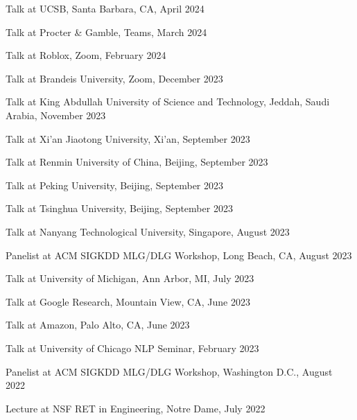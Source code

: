 \documentclass[10pt]{article}
\newenvironment{myindentpar}[1]%
{\begin{list}{}%
         {\setlength{\leftmargin}{#1}}%
         \item[]%
}
{\end{list}}
\newcounter{list}
\begin{document}
\begin{myindentpar}{0.75cm}
\hspace{-0.75cm} Talk at UCSB, Santa Barbara, CA, April 2024

\hspace{-0.75cm} Talk at Procter \& Gamble, Teams, March 2024
	
\hspace{-0.75cm} Talk at Roblox, Zoom, February 2024
	
\hspace{-0.75cm} Talk at Brandeis University, Zoom, December 2023	

\hspace{-0.75cm} Talk at King Abdullah University of Science and Technology, Jeddah, Saudi Arabia, November 2023	

\hspace{-0.75cm} Talk at Xi'an Jiaotong University, Xi'an, September 2023

\hspace{-0.75cm} Talk at Renmin University of China, Beijing, September 2023	
	
\hspace{-0.75cm} Talk at Peking University, Beijing, September 2023	

\hspace{-0.75cm} Talk at Tsinghua University, Beijing, September 2023
	
\hspace{-0.75cm} Talk at Nanyang Technological University, Singapore, August 2023	
	
\hspace{-0.75cm} Panelist at ACM SIGKDD MLG/DLG Workshop, Long Beach, CA, August 2023

\hspace{-0.75cm} Talk at University of Michigan, Ann Arbor, MI, July 2023	

\hspace{-0.75cm} Talk at Google Research, Mountain View, CA, June 2023
	
\hspace{-0.75cm} Talk at Amazon, Palo Alto, CA, June 2023
	
\hspace{-0.75cm} Talk at University of Chicago NLP Seminar, February 2023
	
\hspace{-0.75cm} Panelist at ACM SIGKDD MLG/DLG Workshop, Washington D.C., August 2022
	
\hspace{-0.75cm} Lecture at NSF RET in Engineering, Notre Dame, July 2022
	

\end{myindentpar}
\end{document}
